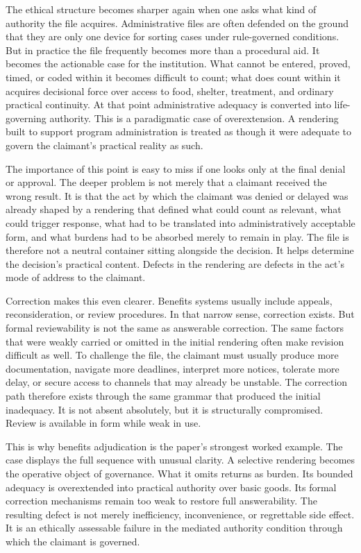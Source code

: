 \documentclass[11pt]{article}
\begin{document}
The ethical structure becomes sharper again when one asks what kind of authority the file acquires. Administrative files are often defended on the ground that they are only one device for sorting cases under rule-governed conditions. But in practice the file frequently becomes more than a procedural aid. It becomes the actionable case for the institution. What cannot be entered, proved, timed, or coded within it becomes difficult to count; what does count within it acquires decisional force over access to food, shelter, treatment, and ordinary practical continuity. At that point administrative adequacy is converted into life-governing authority. This is a paradigmatic case of overextension. A rendering built to support program administration is treated as though it were adequate to govern the claimant's practical reality as such.

The importance of this point is easy to miss if one looks only at the final denial or approval. The deeper problem is not merely that a claimant received the wrong result. It is that the act by which the claimant was denied or delayed was already shaped by a rendering that defined what could count as relevant, what could trigger response, what had to be translated into administratively acceptable form, and what burdens had to be absorbed merely to remain in play. The file is therefore not a neutral container sitting alongside the decision. It helps determine the decision's practical content. Defects in the rendering are defects in the act's mode of address to the claimant.

Correction makes this even clearer. Benefits systems usually include appeals, reconsideration, or review procedures. In that narrow sense, correction exists. But formal reviewability is not the same as answerable correction. The same factors that were weakly carried or omitted in the initial rendering often make revision difficult as well. To challenge the file, the claimant must usually produce more documentation, navigate more deadlines, interpret more notices, tolerate more delay, or secure access to channels that may already be unstable. The correction path therefore exists through the same grammar that produced the initial inadequacy. It is not absent absolutely, but it is structurally compromised. Review is available in form while weak in use.

This is why benefits adjudication is the paper's strongest worked example. The case displays the full sequence with unusual clarity. A selective rendering becomes the operative object of governance. What it omits returns as burden. Its bounded adequacy is overextended into practical authority over basic goods. Its formal correction mechanisms remain too weak to restore full answerability. The resulting defect is not merely inefficiency, inconvenience, or regrettable side effect. It is an ethically assessable failure in the mediated authority condition through which the claimant is governed.
\end{document}
